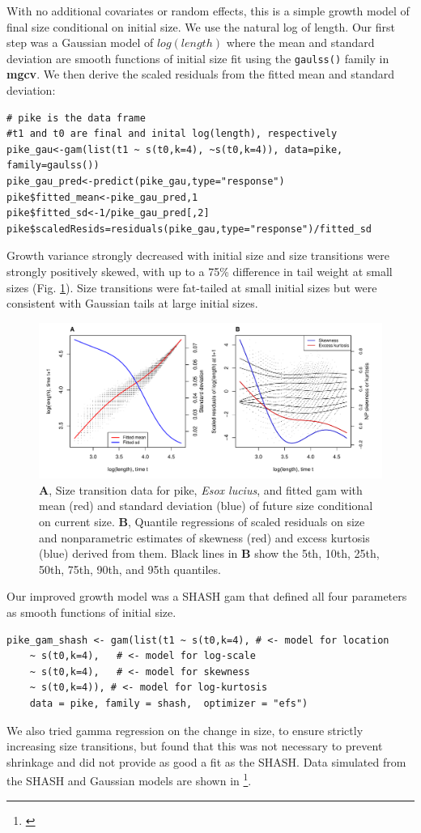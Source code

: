 \documentclass[12pt]{article}
\newcommand{\tom}[2]{{\color{red}{#1}}\footnote{\textit{\color{red}{#2}}}}
\begin{document}
With no additional covariates or random effects, this is a simple growth model of final size conditional on initial size. 
We use the natural log of length. 
Our first step was a Gaussian model of $log(length)$ where the mean and standard deviation are smooth functions of initial size fit using the \texttt{gaulss()} family in \textbf{mgcv}. 
We then derive the scaled residuals from the fitted mean and standard deviation:
\begin{lstlisting}
# pike is the data frame
#t1 and t0 are final and inital log(length), respectively
pike_gau<-gam(list(t1 ~ s(t0,k=4), ~s(t0,k=4)), data=pike, family=gaulss())
pike_gau_pred<-predict(pike_gau,type="response")
pike$fitted_mean<-pike_gau_pred,1
pike$fitted_sd<-1/pike_gau_pred[,2]
pike$scaledResids=residuals(pike_gau,type="response")/fitted_sd
\end{lstlisting}
Growth variance strongly decreased with initial size and size transitions were strongly positively skewed, with up to a 75\% difference in tail weight at small sizes (Fig. \ref{fig:pike_diagnostics}). 
Size transitions were fat-tailed at small initial sizes but were consistent with Gaussian tails at large initial sizes. 

\begin{figure}[tbp]
	\centering
	\includegraphics[width=1.0\textwidth]{figures/pike_resid_diagnostics.pdf}
	\caption{\textbf{A}, Size transition data for pike, \emph{Esox lucius}, and fitted gam with mean (red) and standard deviation (blue) of future size conditional on current size.  \textbf{B}, Quantile regressions of scaled residuals on size and nonparametric estimates of skewness (red) and excess kurtosis (blue) derived from them. Black lines in \textbf{B} show the 5th, 10th, 25th, 50th, 75th, 90th, and 95th quantiles.}
	\label{fig:pike_diagnostics}
\end{figure} 

Our improved growth model was a SHASH gam that defined all four parameters as smooth functions of initial size.
\begin{lstlisting}
pike_gam_shash <- gam(list(t1 ~ s(t0,k=4), # <- model for location 
	~ s(t0,k=4),   # <- model for log-scale
	~ s(t0,k=4),   # <- model for skewness
	~ s(t0,k=4)), # <- model for log-kurtosis
	data = pike, family = shash,  optimizer = "efs")
\end{lstlisting}
We also tried gamma regression on the change in size, to ensure strictly increasing size transitions, but found that this was not necessary to prevent shrinkage and did not provide as good a fit as the SHASH. 
Data simulated from the SHASH and Gaussian models are shown in \tom{Fig. \ref{}}{Tom will get this uploaded once the simulations are done.}.
\end{document}
